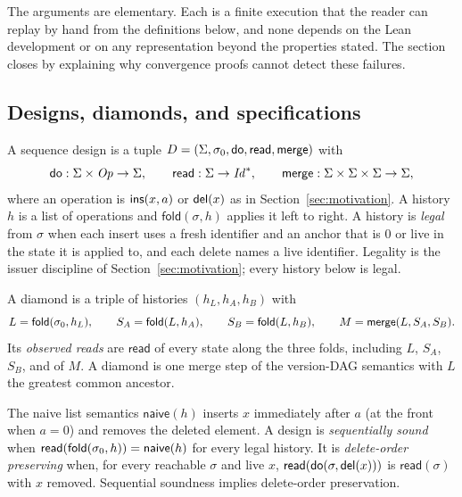 The arguments are elementary. Each is a finite execution that the reader can
replay by hand from the definitions below, and none depends on the Lean
development or on any representation beyond the properties stated. The
section closes by explaining why convergence proofs cannot detect these
failures.

\subsection{Designs, diamonds, and specifications}

\begin{definition}
A sequence design is a tuple
$D=(\Sigma,\init,\mathsf{do},\mathsf{read},\merge)$ with
\[
 \mathsf{do}:\Sigma\times\mathit{Op}\to\Sigma,\qquad
 \mathsf{read}:\Sigma\to\mathit{Id}^{*},\qquad
 \merge:\Sigma\times\Sigma\times\Sigma\to\Sigma,
\]
where an operation is $\ins(x,a)$ or $\del(x)$ as in
Section~\ref{sec:motivation}. A history $h$ is a list of operations and
$\mathsf{fold}(\sigma,h)$ applies it left to right. A history is
\emph{legal} from $\sigma$ when each insert uses a fresh identifier and an
anchor that is $0$ or live in the state it is applied to, and each delete
names a live identifier. Legality is the issuer discipline of
Section~\ref{sec:motivation}; every history below is legal.
\end{definition}

\begin{definition}[diamond]
A diamond is a triple of histories $(h_L,h_A,h_B)$ with
\[
 L=\mathsf{fold}(\init,h_L),\qquad
 S_A=\mathsf{fold}(L,h_A),\qquad
 S_B=\mathsf{fold}(L,h_B),\qquad
 M=\merge(L,S_A,S_B).
\]
Its \emph{observed reads} are $\mathsf{read}$ of every state along the three
folds, including $L$, $S_A$, $S_B$, and of $M$. A diamond is one merge step
of the version-DAG semantics with $L$ the greatest common ancestor.
\end{definition}

\begin{definition}
The naive list semantics $\mathsf{naive}(h)$ inserts $x$ immediately after
$a$ (at the front when $a=0$) and removes the deleted element. A design is
\emph{sequentially sound} when $\mathsf{read}(\mathsf{fold}(\init,h))
=\mathsf{naive}(h)$ for every legal history. It is
\emph{delete-order preserving} when, for every reachable $\sigma$ and live
$x$, $\mathsf{read}(\mathsf{do}(\sigma,\del(x)))$ is
$\mathsf{read}(\sigma)$ with $x$ removed. Sequential soundness implies
delete-order preservation.
\end{definition}

